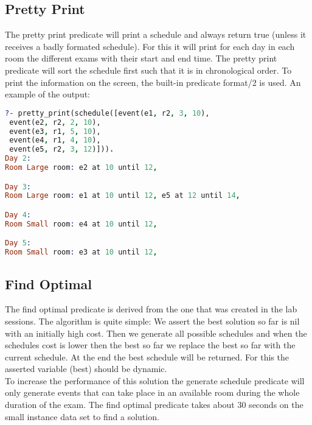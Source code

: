 \documentclass[11pt]{article}
\begin{document}
\subsection{Pretty Print}
The pretty print predicate will print a schedule and always return true (unless it receives a badly formated schedule). For this it will print for each day in each room the different exams with their start and end time. The pretty print predicate will sort the schedule first such that it is in chronological order. To print the information on the screen, the built-in predicate format/2 is used. An example of the output:
\begin{lstlisting}[basicstyle=\small,language=prolog]
?- pretty_print(schedule([event(e1, r2, 3, 10),
 event(e2, r2, 2, 10),
 event(e3, r1, 5, 10),
 event(e4, r1, 4, 10),
 event(e5, r2, 3, 12)])).
Day 2: 
Room Large room: e2 at 10 until 12, 

Day 3: 
Room Large room: e1 at 10 until 12, e5 at 12 until 14, 

Day 4: 
Room Small room: e4 at 10 until 12, 

Day 5: 
Room Small room: e3 at 10 until 12, 
\end{lstlisting}

\subsection{Find Optimal}
The find optimal predicate is derived from the one that was created in the lab sessions. The algorithm is quite simple: We assert the best solution so far is nil with an initially high cost. Then we generate all possible schedules and when the schedules cost is lower then the best so far we replace the best so far with the current schedule. At the end the best schedule will be returned. For this the asserted variable (best) should be dynamic.\\
To increase the performance of this solution the generate schedule predicate will only generate events that can take place in an available room during the whole duration of the exam. The find optimal predicate takes about 30 seconds on the small instance data set to find a solution.
\end{document}
